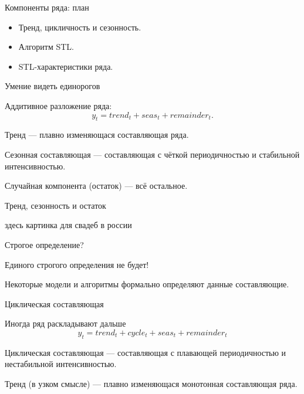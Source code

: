 
\begin{frame} %


\end{frame}



\begin{frame}{Компоненты ряда: план}
  \begin{itemize}[<+->]
    \item Тренд, цикличность и сезонность.
    \item Алгоритм STL.
    \item STL-характеристики ряда. 
  \end{itemize}

\end{frame}


\begin{frame}{Умение видеть единорогов}

Аддитивное разложение ряда:
\[
y_t = trend_t + seas_t + remainder_t.
\]

\pause

\alert{Тренд} — плавно изменяющася составляющая ряда.

\pause

\alert{Сезонная составляющая} — составляющая с чёткой периодичностью и стабильной интенсивностью.

\pause

\alert{Случайная компонента} (остаток) — всё остальное. 

\end{frame}

\begin{frame}{Тренд, сезонность и остаток}

здесь картинка для свадеб в россии 

\end{frame}

\begin{frame}{Строгое определение?}

\pause
Единого строгого определения \alert{не} будет!

\pause
Некоторые модели и алгоритмы формально \alert{определяют} данные составляющие.

\end{frame}

\begin{frame}{Циклическая составляющая}

Иногда ряд раскладывают дальше
\[
y_t = trend_t + cycle_t + seas_t + remainder_t
\]

\pause
\alert{Циклическая составляющая} — составляющая с плавающей периодичностью и нестабильной интенсивностью. 


\pause
\alert{Тренд} (в узком смысле) —  плавно изменяющася монотонная составляющая ряда.

\end{frame}


